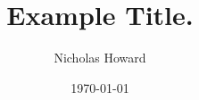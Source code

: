 \title{Example Title.}
\author{Nicholas Howard}

\date{\today}

\def\abstractmatter{
%
Lorem ipsum dolor sit amet, qui minim labore adipisicing minim.
%
}
